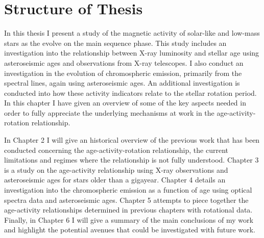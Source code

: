 \section{Structure of Thesis}
In this thesis I present a study of the magnetic activity of solar-like and low-mass stars as the evolve on the main sequence phase. This study includes an investigation into the relationship between X-ray luminosity and stellar age using asteroseismic ages and observations from X-ray telescopes. I also conduct an investigation in the evolution of chromospheric emission, primarily from the \caII spectral lines, again using asteroseismic ages. An additional investigation is conducted into how these activity indicators relate to the stellar rotation period. In this chapter I have given an overview of some of the key aspects needed in order to fully appreciate the underlying mechanisms at work in the age-activity-rotation relationship.

In Chapter 2 I will give an historical overview of the previous work that has been conducted concerning the age-activity-rotation relationship, the current limitations and regimes where the relationship is not fully understood. Chapter 3 is a study on the age-activity relationship using X-ray observations and asteroseismic ages for stars older than a gigayear. Chapter 4 details an investigation into the chromospheric emission as a function of age using optical spectra data and asteroseismic ages. Chapter 5 attempts to piece together the age-activity relationships determined in previous chapters with rotational data. Finally, in Chapter 6 I will give a summary of the main conclusions of my work and highlight the potential avenues that could be investigated with future work.
